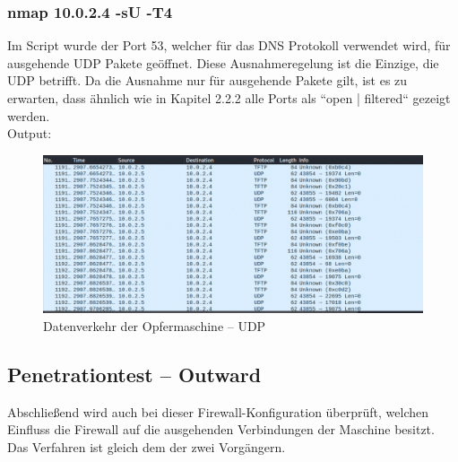 \subsubsection{nmap 10.0.2.4 -sU -T4}
Im Script wurde der Port 53, welcher für das DNS Protokoll verwendet wird, für ausgehende UDP Pakete geöffnet. Diese Ausnahmeregelung ist die Einzige, die UDP betrifft. Da die Ausnahme nur für ausgehende Pakete gilt, ist es zu erwarten, dass ähnlich wie in Kapitel 2.2.2 alle Ports als ``open | filtered`` gezeigt werden. \\
Output: 


\begin{figure}
	\includegraphics[width=\linewidth]{img/ws_firewall_standard_udp.png}
	\caption{Datenverkehr der Opfermaschine – UDP}
	\label{fig:ws_firewall_standard_udp}
\end{figure}
\subsection{Penetrationtest – Outward}

Abschließend wird auch bei dieser Firewall-Konfiguration überprüft, welchen Einfluss die Firewall auf die ausgehenden Verbindungen der Maschine besitzt. Das Verfahren ist gleich dem der zwei Vorgängern. 

